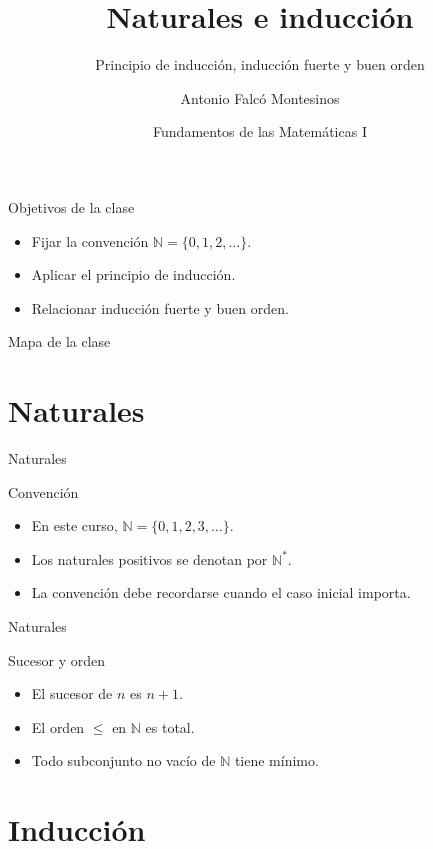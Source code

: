 \documentclass[aspectratio=169,11pt]{beamer}
\title[FdM I -- Clase 15]{Naturales e inducción}
\subtitle{Principio de inducción, inducción fuerte y buen orden}
\author{Antonio Falcó Montesinos}
\institute{Universidad CEU Cardenal Herrera}
\date{Fundamentos de las Matemáticas I}
\begin{document}
\begin{frame}
  \titlepage
\end{frame}

\begin{frame}{Objetivos de la clase}
\begin{itemize}
  \item Fijar la convención \(\mathbb{N}=\{0,1,2,\ldots\}\).
  \item Aplicar el principio de inducción.
  \item Relacionar inducción fuerte y buen orden.
\end{itemize}
\end{frame}

\begin{frame}{Mapa de la clase}
\tableofcontents
\end{frame}

\section{Naturales}

\begin{frame}{Naturales}
\begin{block}{Convención}
\begin{itemize}
  \item En este curso, \(\mathbb{N}=\{0,1,2,3,\ldots\}\).
  \item Los naturales positivos se denotan por \(\mathbb{N}^{\ast}\).
  \item La convención debe recordarse cuando el caso inicial importa.
\end{itemize}
\end{block}
\end{frame}

\begin{frame}{Naturales}
\begin{block}{Sucesor y orden}
\begin{itemize}
  \item El sucesor de \(n\) es \(n+1\).
  \item El orden \(\leq\) en \(\mathbb{N}\) es total.
  \item Todo subconjunto no vacío de \(\mathbb{N}\) tiene mínimo.
\end{itemize}
\end{block}
\end{frame}

\section{Inducción}
\end{document}
